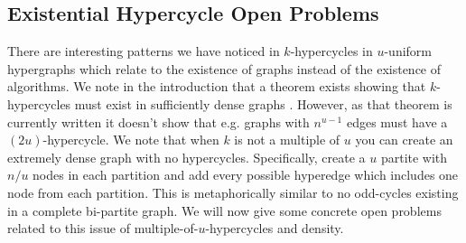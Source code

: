 \documentclass[11pt,letterpaper,pdftex]{article}
\begin{document}
\subsection{Existential Hypercycle Open Problems}
There are interesting patterns we have noticed in $k$-hypercycles in $u$-uniform hypergraphs which  relate to the existence of graphs instead of the existence of algorithms. We note in the introduction that a theorem exists showing that $k$-hypercycles must exist in sufficiently dense graphs \cite{allen2015tight}. However, as that theorem is currently written it doesn't show that e.g. graphs with $n^{u-1}$ edges must have a $(2u)$-hypercycle. We note that when $k$ is not a multiple of $u$ you can create an extremely dense graph with no hypercycles. Specifically, create a $u$ partite with $n/u$ nodes in each partition and add every possible hyperedge which includes one node from each partition. This is metaphorically similar to no odd-cycles existing in a complete bi-partite graph. We will now give some concrete open problems related to this issue of multiple-of-$u$-hypercycles and density. 
\end{document}
